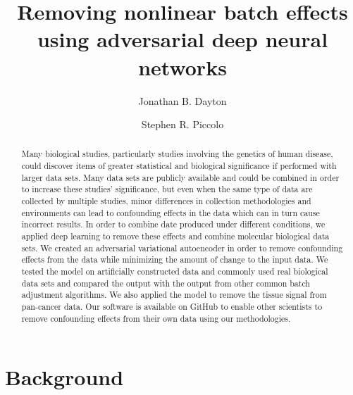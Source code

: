 \documentclass[notitlepage]{article}
\begin{document}
\title{Removing nonlinear batch effects using adversarial deep neural networks}
\author[1]{Jonathan B. Dayton}
\author[1]{Stephen R. Piccolo}
\date{}

\maketitle

\begin{abstract}
	Many biological studies, particularly studies involving the genetics of human disease, could discover items of greater statistical and biological significance if performed with larger data sets.
	Many data sets are publicly available and could be combined in order to increase these studies' significance, but even when the same type of data are collected by multiple studies, minor differences in collection methodologies and environments can lead to confounding effects in the data which can in turn cause incorrect results.
	In order to combine date produced under different conditions, we applied deep learning to remove these effects and combine molecular biological data sets.
	We created an adversarial variational autoencoder in order to remove confounding effects from the data while minimizing the amount of change to the input data.
	We tested the model on artificially constructed data and commonly used real biological data sets and compared the output with the output from other common batch adjustment algorithms.
	We also applied the model to remove the tissue signal from pan-cancer data.
	Our software is available on GitHub to enable other scientists to remove confounding effects from their own data using our methodologies.
\end{abstract}

\section{Background} \label{sec:background}
\end{document}
